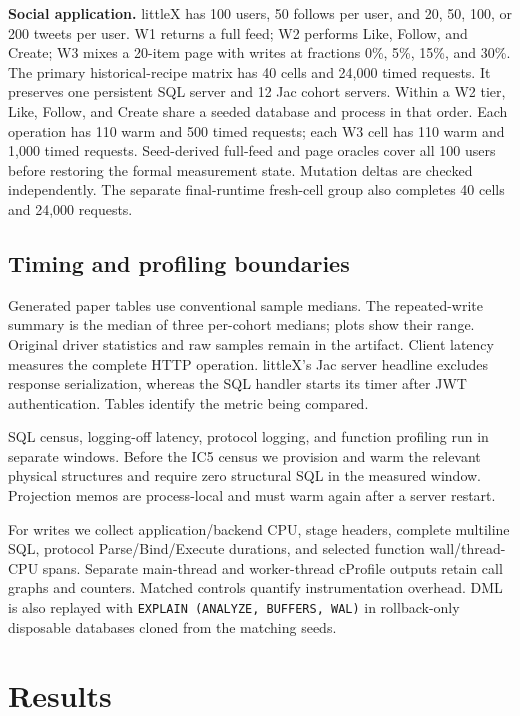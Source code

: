 \documentclass[sigconf,nonacm]{acmart}
\newcommand{\code}[1]{\texttt{#1}}
\begin{document}
\textbf{Social application.} littleX has 100 users, 50 follows per user, and
20, 50, 100, or 200 tweets per user. W1 returns a full feed; W2 performs
Like, Follow, and Create; W3 mixes a 20-item page with writes at fractions
0\%, 5\%, 15\%, and 30\%. The primary historical-recipe matrix has 40 cells
and 24,000 timed requests. It preserves one persistent SQL server and 12 Jac
cohort servers. Within a W2 tier, Like, Follow, and Create share a seeded
database and process in that order. Each operation has 110 warm and 500 timed
requests; each W3 cell has 110 warm and 1,000 timed requests. Seed-derived
full-feed and page oracles cover all 100 users before restoring the formal
measurement state. Mutation deltas are checked independently. The separate
final-runtime fresh-cell group also completes 40 cells and 24,000 requests.

\subsection{Timing and profiling boundaries}
Generated paper tables use conventional sample medians. The repeated-write
summary is the median of three per-cohort medians; plots show their range.
Original driver statistics and raw samples remain in the artifact. Client
latency measures the complete HTTP operation. littleX's Jac server headline
excludes response serialization, whereas the SQL handler starts its timer
after JWT authentication. Tables identify the metric being compared.

SQL census, logging-off latency, protocol logging, and function profiling run
in separate windows. Before the IC5 census we provision and warm the relevant
physical structures and require zero structural SQL in the measured window.
Projection memos are process-local and must warm again after a server restart.

For writes we collect application/backend CPU, stage headers, complete
multiline SQL, protocol Parse/Bind/Execute durations, and selected function
wall/thread-CPU spans. Separate main-thread and worker-thread cProfile outputs
retain call graphs and counters. Matched controls quantify instrumentation
overhead. DML is also replayed with \code{EXPLAIN (ANALYZE, BUFFERS, WAL)} in
rollback-only disposable databases cloned from the matching seeds.

\section{Results}
\label{sec:results}
\end{document}

